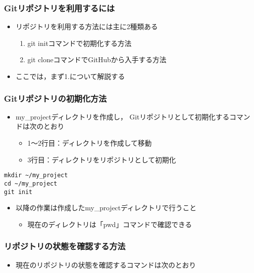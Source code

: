 \documentclass[a4paper,twoside,twocolumn]{bxjsarticle}
\begin{document}
\subsubsection{Gitリポジトリを利用するには}
\label{sec-1-2-2}
\begin{itemize}
\item リポジトリを利用する方法には主に2種類ある
\begin{enumerate}
\item git initコマンドで初期化する方法
\item git cloneコマンドでGitHubから入手する方法
\end{enumerate}
\item ここでは，まず1.について解説する
\end{itemize}

\subsubsection{Gitリポジトリの初期化方法}
\label{sec-1-2-3}
\begin{itemize}
\item my\_projectディレクトリを作成し，
  Gitリポジトリとして初期化するコマンドは次のとおり
\begin{itemize}
\item 1〜2行目：ディレクトリを作成して移動
\item 3行目：ディレクトリをリポジトリとして初期化
\end{itemize}
\end{itemize}

\begin{verbatim}
mkdir ~/my_project
cd ~/my_project
git init
\end{verbatim}

\begin{itemize}
\item 以降の作業は作成したmy\_projectディレクトリで行うこと
\begin{itemize}
\item 現在のディレクトリは「pwd」コマンドで確認できる
\end{itemize}
\end{itemize}

\subsubsection{リポジトリの状態を確認する方法}
\label{sec-1-2-4}
\begin{itemize}
\item 現在のリポジトリの状態を確認するコマンドは次のとおり
\end{itemize}
\end{document}

